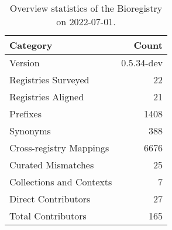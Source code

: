 \begin{table}
\centering
\caption{Overview statistics of the Bioregistry on 2022-07-01.}
\label{tab:bioregistry-summary}
\begin{tabular}{lr}
\toprule
                Category &      Count \\
\midrule
                 Version & 0.5.34-dev \\
     Registries Surveyed &         22 \\
      Registries Aligned &         21 \\
                Prefixes &       1408 \\
                Synonyms &        388 \\
 Cross-registry Mappings &       6676 \\
      Curated Mismatches &         25 \\
Collections and Contexts &          7 \\
     Direct Contributors &         27 \\
      Total Contributors &        165 \\
\bottomrule
\end{tabular}
\end{table}
